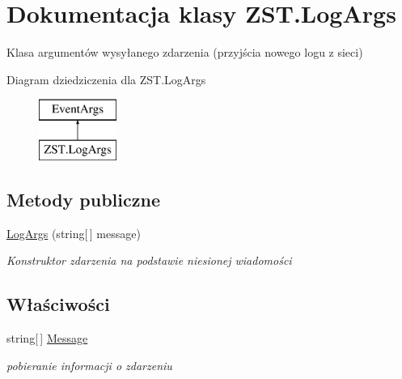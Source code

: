 \hypertarget{class_z_s_t_1_1_log_args}{}\section{Dokumentacja klasy Z\+S\+T.\+Log\+Args}
\label{class_z_s_t_1_1_log_args}


Klasa argumentów wysyłanego zdarzenia (przyjścia nowego logu z sieci)  


Diagram dziedziczenia dla Z\+S\+T.\+Log\+Args\begin{figure}[H]
\begin{center}
\leavevmode
\includegraphics[height=2.000000cm]{class_z_s_t_1_1_log_args}
\end{center}
\end{figure}
\subsection*{Metody publiczne}
\begin{DoxyCompactItemize}
\item 
\hyperlink{class_z_s_t_1_1_log_args_abbdad34b1e99cad66cdef74c97772980}{Log\+Args} (string\mbox{[}$\,$\mbox{]} message)
\begin{DoxyCompactList}\small\item\em Konstruktor zdarzenia na podstawie niesionej wiadomości \end{DoxyCompactList}\end{DoxyCompactItemize}
\subsection*{Właściwości}
\begin{DoxyCompactItemize}
\item 
string\mbox{[}$\,$\mbox{]} \hyperlink{class_z_s_t_1_1_log_args_a135eb4cae47cdbbbb4b54bbb783f9540}{Message}
\begin{DoxyCompactList}\small\item\em pobieranie informacji o zdarzeniu \end{DoxyCompactList}\end{DoxyCompactItemize}


